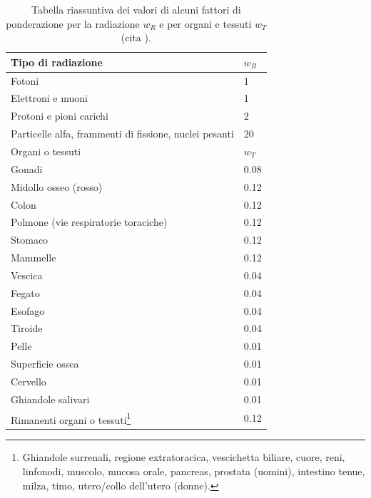 \documentclass[12pt,a4paper,twoside]{report}
\begin{document}
	\begin{table}[H]
		\begin{minipage}{\textwidth}
			\centering
			\begin{tabular}{ |m{10.5cm}||M{3.5cm}| }
				\hline
				Tipo di radiazione & $w_R$ \\
				\hline\hline
				Fotoni & 1\\
				\hline
				Elettroni e muoni & 1\\
				\hline
				Protoni e pioni carichi & 2\\
				\hline
				Particelle alfa, frammenti di fissione, nuclei pesanti & 20\\
				\hline\hline
				Organi o tessuti & $w_T$\\
				\hline\hline
				Gonadi & 0.08 \\
				\hline
				Midollo osseo (rosso) & 0.12\\
				\hline
				Colon & 0.12\\
				\hline
				Polmone (vie respiratorie toraciche) & 0.12\\
				\hline
				Stomaco & 0.12\\
				\hline
				Mammelle & 0.12\\
				\hline
				Vescica & 0.04\\
				\hline
				Fegato & 0.04\\
				\hline
				Esofago & 0.04\\
				\hline
				Tiroide & 0.04\\
				\hline
				Pelle & 0.01\\
				\hline
				Superficie ossea & 0.01\\
				\hline
				Cervello & 0.01\\
				\hline
				Ghiandole salivari & 0.01\\
				\hline
				Rimanenti organi o tessuti\footnote{Ghiandole surrenali, regione extratoracica, vescichetta biliare, cuore, reni, linfonodi, muscolo, mucosa orale, pancreas, prostata (uomini), intestino tenue, milza, timo, utero/collo dell'utero (donne).} & 0.12\\
				\hline
			\end{tabular}
		\end{minipage}
		\caption{Tabella riassuntiva dei valori di alcuni fattori di ponderazione per la radiazione $w_R$ e per organi e tessuti $w_T$ (cita
				).}
		\label{tab:w_factor}
	\end{table}
	
\end{document}
